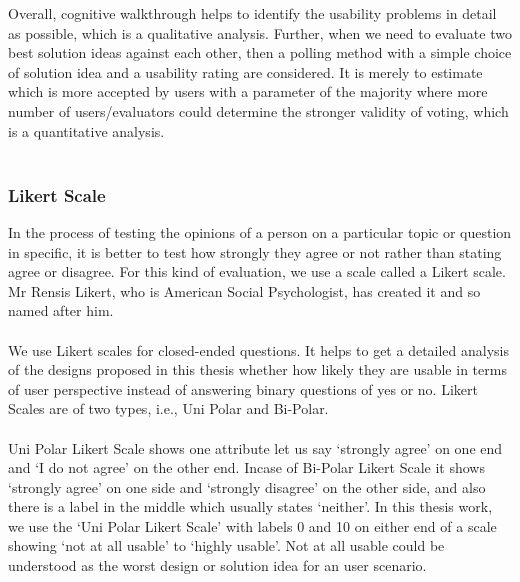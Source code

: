 Overall, cognitive walkthrough helps to identify the usability problems in detail as possible, which is a qualitative analysis. Further, when we need to evaluate two best solution ideas against each other, then a polling method with a simple choice of solution idea and a usability rating are considered. It is merely to estimate which is more accepted by users with a parameter of the majority where more number of users/evaluators could determine the stronger validity of voting, which is a quantitative analysis. \\ \\

\subsubsection{Likert Scale}

In the process of testing the opinions of a person on a particular topic or question in specific, it is better to test how strongly they agree or not rather than stating agree or disagree. For this kind of evaluation, we use a scale called a Likert scale. \cite{likert} Mr Rensis Likert, who is American Social Psychologist, has created it and so named after him. \\ \\

We use Likert scales for closed-ended questions. It helps to get a detailed analysis of the designs proposed in this thesis whether how likely they are usable in terms of user perspective instead of answering binary questions of yes or no. Likert Scales are of two types, i.e., Uni Polar and Bi-Polar. \\ \\

Uni Polar Likert Scale shows one attribute let us say ‘strongly agree’ on one end and ‘I do not agree’ on the other end. Incase of Bi-Polar Likert Scale it shows ‘strongly agree’ on one side and ‘strongly disagree’ on the other side, and also there is a label in the middle which usually states ‘neither’. In this thesis work, we use the ‘Uni Polar Likert Scale’ with labels 0 and 10 on either end of a scale showing ‘not at all usable’ to ‘highly usable’. Not at all usable could be understood as the worst design or solution idea for an user scenario.\\ \\

\let\cleardoublepage\clearpage


